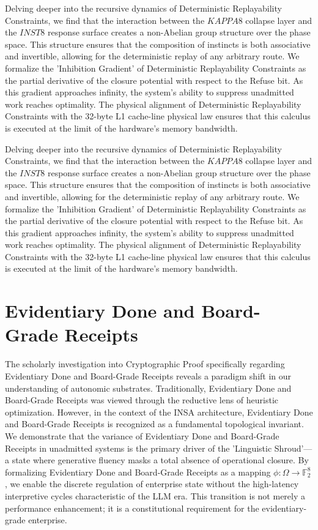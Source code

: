 \documentclass[12pt,a4paper,oneside]{book}
\begin{document}
Delving deeper into the recursive dynamics of Deterministic Replayability Constraints, we find that the interaction between the $KAPPA8$ collapse layer and the $INST8$ response surface creates a non-Abelian group structure over the phase space. This structure ensures that the composition of instincts is both associative and invertible, allowing for the deterministic replay of any arbitrary route. We formalize the 'Inhibition Gradient' of Deterministic Replayability Constraints as the partial derivative of the closure potential with respect to the Refuse bit. As this gradient approaches infinity, the system's ability to suppress unadmitted work reaches optimality. The physical alignment of Deterministic Replayability Constraints with the 32-byte L1 cache-line physical law ensures that this calculus is executed at the limit of the hardware's memory bandwidth. 

Delving deeper into the recursive dynamics of Deterministic Replayability Constraints, we find that the interaction between the $KAPPA8$ collapse layer and the $INST8$ response surface creates a non-Abelian group structure over the phase space. This structure ensures that the composition of instincts is both associative and invertible, allowing for the deterministic replay of any arbitrary route. We formalize the 'Inhibition Gradient' of Deterministic Replayability Constraints as the partial derivative of the closure potential with respect to the Refuse bit. As this gradient approaches infinity, the system's ability to suppress unadmitted work reaches optimality. The physical alignment of Deterministic Replayability Constraints with the 32-byte L1 cache-line physical law ensures that this calculus is executed at the limit of the hardware's memory bandwidth. 

\section{Evidentiary Done and Board-Grade Receipts}
The scholarly investigation into Cryptographic Proof specifically regarding Evidentiary Done and Board-Grade Receipts reveals a paradigm shift in our understanding of autonomic substrates. Traditionally, Evidentiary Done and Board-Grade Receipts was viewed through the reductive lens of heuristic optimization. However, in the context of the INSA architecture, Evidentiary Done and Board-Grade Receipts is recognized as a fundamental topological invariant. We demonstrate that the variance of Evidentiary Done and Board-Grade Receipts in unadmitted systems is the primary driver of the 'Linguistic Shroud'---a state where generative fluency masks a total absence of operational closure. By formalizing Evidentiary Done and Board-Grade Receipts as a mapping $\phi: \Omega \to \mathbb{F}_2^8$, we enable the discrete regulation of enterprise state without the high-latency interpretive cycles characteristic of the LLM era. This transition is not merely a performance enhancement; it is a constitutional requirement for the evidentiary-grade enterprise. 
\end{document}
